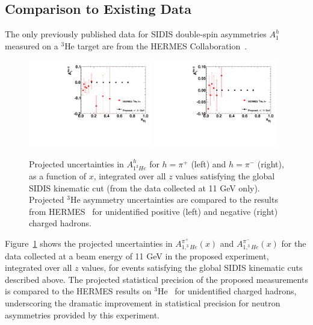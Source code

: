 \subsection{Comparison to Existing Data}
The only previously published data for SIDIS double-spin asymmetries $A_{1}^h$ measured on a $^3$He target are from the HERMES Collaboration~\cite{Ackerstaff:1999ey}. 
\begin{figure}[h]
  \begin{center}
    \includegraphics[width=0.48\textwidth]{figures/A1He3hplus_HERMES_compare.pdf}
    \includegraphics[width=0.48\textwidth]{figures/A1He3hminus_HERMES_compare.pdf}
  \end{center}
  \caption{\label{fig:A1heliumHERMEScomparison} Projected uncertainties in $A^{h}_{1^3He}$ for $h = \pi^+$ (left) and $h = \pi^-$ (right), as a function of $x$, integrated over all $z$ values satisfying the global SIDIS kinematic cut (from the data collected at 11 GeV only). Projected $^3$He asymmetry uncertainties are compared to the results from HERMES~\cite{Ackerstaff:1999ey} for unidentified positive (left) and negative (right) charged hadrons. }
\end{figure}
Figure~\ref{fig:A1heliumHERMEScomparison} shows the projected uncertainties in $A_{1,^3He}^{\pi^+}(x)$ and $A_{1,^3He}^{\pi^-}(x)$ for the data collected at a beam energy of 11 GeV in the proposed experiment, integrated over all $z$ values, for events satisfying the global SIDIS kinematic cuts described above. The projected statistical precision of the proposed measurements is compared to the HERMES results on $^3$He~\cite{Ackerstaff:1999ey} for unidentified charged hadrons, underscoring the dramatic improvement in statistical precision for neutron asymmetries provided by this experiment. 

